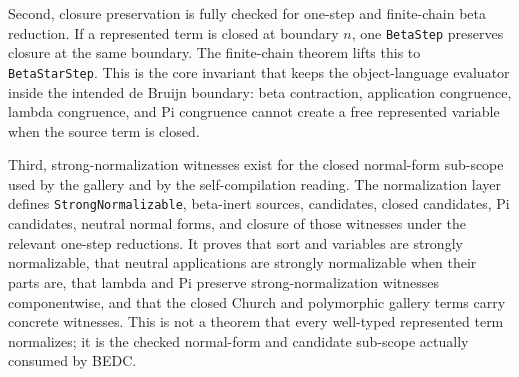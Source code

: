 
Second, closure preservation is fully checked for one-step and finite-chain
beta reduction.  If a represented term is closed at boundary $n$, one
\texttt{BetaStep} preserves closure at the same boundary.  The finite-chain
theorem lifts this to \texttt{BetaStarStep}.  This is the core invariant that
keeps the object-language evaluator inside the intended de Bruijn boundary:
beta contraction, application congruence, lambda congruence, and Pi congruence
cannot create a free represented variable when the source term is closed.


Third, strong-normalization witnesses exist for the closed normal-form
sub-scope used by the gallery and by the self-compilation reading.  The
normalization layer defines \texttt{StrongNormalizable}, beta-inert sources,
candidates, closed candidates, Pi candidates, neutral normal forms, and
closure of those witnesses under the relevant one-step reductions.  It proves
that sort and variables are strongly normalizable, that neutral applications
are strongly normalizable when their parts are, that lambda and Pi preserve
strong-normalization witnesses componentwise, and that the closed Church and
polymorphic gallery terms carry concrete witnesses.  This is not a theorem
that every well-typed represented term normalizes; it is the checked
normal-form and candidate sub-scope actually consumed by BEDC.


